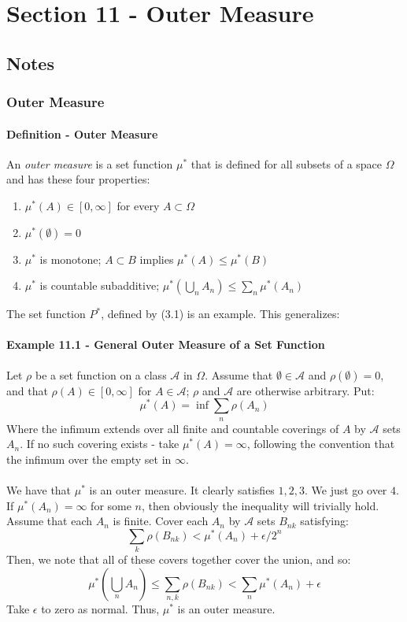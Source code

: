 \documentclass[12pt,a4paper]{article}
\newcommand{\1}[1]{\mathbbm{1}\left\{ #1 \right\}}
\newcommand{\acal}{\mathcal{A}}
\begin{document}
\section{Section 11 - Outer Measure}
\subsection{Notes}
\subsubsection{Outer Measure} 
\paragraph{Definition - Outer Measure} An \textit{outer measure} is a set function $\mu^*$ that is defined for all subsets of a space $\Omega$ and has these four properties:
\begin{enumerate}
	\item $\mu^*(A) \in [0,\infty]$ for every $A \subset \Omega$
	\item $\mu^*(\emptyset) = 0$
	\item $\mu^*$ is monotone; $A \subset B$ implies $\mu^*(A) \leq \mu^*(B)$
	\item $\mu^*$ is countable subadditive; $\mu^*\left(\bigcup_n A_n\right) \leq \sum_n \mu^*(A_n)$
\end{enumerate}
The set function $P^*$, defined by (3.1) is an example. This generalizes:

\paragraph{Example 11.1 - General Outer Measure of a Set Function} Let $\rho$ be a set function on a class $\acal$ in $\Omega$. Assume that $\emptyset \in \acal$ and $\rho(\emptyset) = 0$, and that $\rho(A) \in [0,\infty]$ for $A \in \acal$; $\rho$ and $\acal$ are otherwise arbitrary. Put:
$$
	\mu^*(A) = \inf \sum_n \rho(A_n)
$$
Where the infimum extends over all finite and countable coverings of $A$ by $\acal$ sets $A_n$. If no such covering exists - take $\mu^*(A) = \infty$, following the convention that the infimum over the empty set in $\infty$.
\\\\
We have that $\mu^*$ is an outer measure. It clearly satisfies $1, 2, 3$. We just go over $4$. If $\mu^*(A_n) = \infty$ for some $n$, then obviously the inequality will trivially hold. Assume that each $A_n$ is finite. Cover each $A_n$ by $\acal$ sets $B_{nk}$ satisfying:
$$
	\sum_k \rho(B_{nk}) < \mu^*(A_n) + \epsilon/2^n
$$
Then, we note that all of these covers together cover the union, and so:
$$
	\mu^*\left(\bigcup_n A_n\right) \leq \sum_{n,k} \rho(B_{nk}) < \sum_n \mu^*(A_n) + \epsilon
$$
Take $\epsilon$ to zero as normal. Thus, $\mu^*$ is an outer measure.
\end{document}

